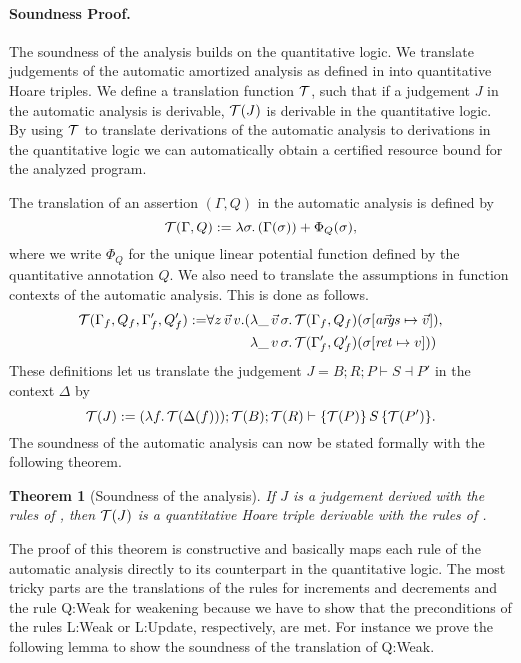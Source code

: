 \documentclass[nocopyrightspace,preprint]{sigplanconf}
\newcommand{\pref}[1]{\prettyref{#1}}
\newtheorem{theorem}{Theorem}
\begin{document}
\paragraph{Soundness Proof.}

The soundness of the analysis builds on the quantitative logic.  We
translate judgements of the automatic amortized analysis as defined in
\pref{fig:auto} into quantitative Hoare triples.  We define a
translation function $\mathcal T$, such that if a judgement $J$ in the
automatic analysis is derivable, $\mathcal T(J)$ is derivable in the
quantitative logic.  By using $\mathcal T$ to translate derivations of the
automatic analysis to derivations in the quantitative logic we can
automatically obtain a certified resource bound for the analyzed
program.

The translation of an assertion $(\Gamma, Q)$ in the automatic
analysis is defined by
$$
  \mathcal T(\Gamma, Q) := \lambda\sigma .\, (\Gamma(\sigma)) + \Phi_Q(\sigma),
$$
where we write $\Phi_Q$ for the unique linear potential function
defined by the quantitative annotation $Q$.  We also need to
translate the assumptions in function contexts of the automatic
analysis.  This is done as follows.
%
\begin{align*}
\mathcal T(\Gamma_f, Q_f, \Gamma'_f, Q'_f) :=
&\forall z \, \vec v \, v . (
  \lambda \_ \, \vec v \, \sigma .\, \mathcal T(\Gamma_f, Q_f)(\sigma[{\vec {\mathit{args}}} \mapsto \vec v]), \\
&\phantom{\forall z \, \vec v \, v . (}
  \lambda \_ \, v \, \sigma .\, \mathcal T(\Gamma'_f, Q'_f)(\sigma[{\mathit{ret}} \mapsto v])
  )
\end{align*}
%
These definitions let us translate the judgement $J = B; R; P \vdash
S \dashv P'$ in the context $\Delta$ by
$$
  \mathcal T(J) :=
  (\lambda f .\, \mathcal T(\Delta(f))); \mathcal T(B); \mathcal T(R) \vdash
    \{\mathcal T(P)\}\, S\, \{\mathcal T(P')\}.
$$
The soundness of the automatic analysis can now be stated
formally with the following theorem.
%
\begin{theorem}[Soundness of the analysis]
  If $J$ is a judgement derived with the rules of
  \pref{fig:auto}, then $\mathcal T(J)$ is a quantitative
  Hoare triple derivable with the rules of
  \pref{fig:logic}.
\end{theorem}
%
\noindent
The proof of this theorem is constructive and basically maps each rule
of the automatic analysis directly to its counterpart in the
quantitative logic.  The most tricky parts are the translations of the
rules for increments and decrements and the rule {\sc Q:Weak} for
weakening because we have to show that the preconditions of the rules
{\sc L:Weak} or {\sc L:Update}, respectively, are met.  For instance
we prove the following lemma to show the soundness of the translation
of {\sc Q:Weak}.
\end{document}
